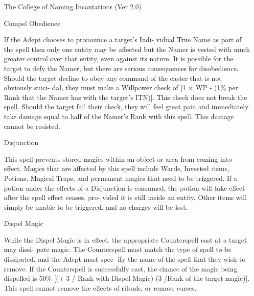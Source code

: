 \begin{Chapter}{The College of Naming Incantations (Ver 2.0)}
\begin{spell}[S-3]{Compel Obedience }
\begin{effects}
If  the  Adept  chooses  to  pronounce  a  target’s  Indi-
vidual True Name as part of the spell then only one 
entity may be affected but the Namer is vested with 
much greater control over that entity, even against 
its  nature.  It  is  possible  for  the  target  to  defy  the 
Namer,  but  there  are  serious  consequences  for 
disobedience. Should the target decline to obey any 
command  of the  caster  that  is  not  obviously  suici-
dal, they must make a Willpower check of [1 × WP 
- (1\% per Rank that the Namer has with the target’s 
ITN)]. This check does not break the spell. Should 
the target fail their check, they will feel great pain 
and  immediately  take  damage  equal  to  half  of  the 
Namer’s Rank with this spell. This damage cannot 
be resisted. 

\end{effects}
\end{spell}

\begin{spell}[S-4]{Disjunction }

\begin{effects}
This spell prevents stored magics within an 
object or area from coming into effect. Magics that 
are  affected  by  this  spell  include  Wards,  Invested 
items,  Potions,  Magical  Traps,  and  permanent 
magics that need to be triggered.  If a potion under 
the effects of a Disjunction is consumed, the potion 
will  take  effect  after  the  spell  effect  ceases,  pro-
vided  it  is  still  inside  an  entity.  Other  items  will 
simply  be  unable  to  be  triggered,  and  no  charges 
will be lost. 

\end{effects}
\end{spell}

\begin{spell}[S-5]{Dispel Magic }

\begin{effects}
 While  the  Dispel  Magic  is  in  effect,  the 
appropriate Counterspell cast at a target may dissi-
pate magic. The Counterspell must match the  type 
of spell to be dissipated, and the Adept must spec-
ify the name of the spell that they wish to remove. 
If the Counterspell is successfully cast, the chance 
of  the  magic  being  dispelled  is  50\%  [(+  3  /  Rank 
with Dispel Magic) (3 /Rank of the target magic)]. 
This  spell  cannot  remove  the  effects  of  rituals,  or 
remove curses. 


\end{effects}
\end{spell}
\end{Chapter}
